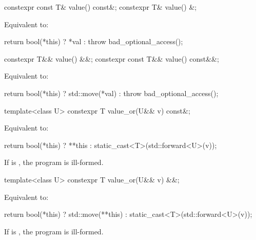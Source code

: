%
\begin{itemdecl}
constexpr const T& value() const&;
constexpr T& value() &;
\end{itemdecl}

\begin{itemdescr}
\pnum
\effects
Equivalent to:
\begin{codeblock}
return bool(*this) ? *val : throw bad_optional_access();
\end{codeblock}
\end{itemdescr}

%
\begin{itemdecl}
constexpr T&& value() &&;
constexpr const T&& value() const&&;
\end{itemdecl}

\begin{itemdescr}

\pnum
\effects
Equivalent to:
\begin{codeblock}
return bool(*this) ? std::move(*val) : throw bad_optional_access();
\end{codeblock}
\end{itemdescr}

%
\begin{itemdecl}
template<class U> constexpr T value_or(U&& v) const&;
\end{itemdecl}

\begin{itemdescr}
\pnum
\effects
Equivalent to:
\begin{codeblock}
return bool(*this) ? **this : static_cast<T>(std::forward<U>(v));
\end{codeblock}

\pnum
\remarks
If  is ,
the program is ill-formed.
\end{itemdescr}

%
\begin{itemdecl}
template<class U> constexpr T value_or(U&& v) &&;
\end{itemdecl}

\begin{itemdescr}
\pnum
\effects
Equivalent to:
\begin{codeblock}
return bool(*this) ? std::move(**this) : static_cast<T>(std::forward<U>(v));
\end{codeblock}

\pnum
\remarks
If  is ,
the program is ill-formed.
\end{itemdescr}

